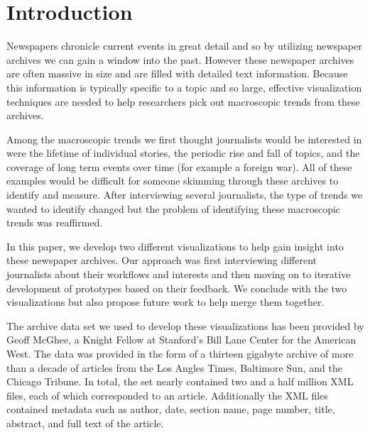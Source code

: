 \section{Introduction}
Newspapers chronicle current events in great detail and so by utilizing newspaper archives we can gain a window into the past. However these newspaper archives are often massive in size and are filled with detailed text information. Because this information is typically specific to a topic and so large, effective visualization techniques are needed to help researchers pick out macroscopic trends from these archives.

Among the macroscopic trends we first thought journalists would be interested in were the lifetime of individual stories, the periodic rise and fall of topics, and the coverage of long term events over time (for example a foreign war). All of these examples would be difficult for someone skimming through these archives to identify and measure. After interviewing several journalists, the type of trends we wanted to identify changed but the problem of identifying these macroscopic trends was reaffirmed.

In this paper, we develop two different visualizations to help gain insight into these newspaper archives. Our approach was first interviewing different journalists about their workflows and interests and then moving on to iterative development of prototypes based on their feedback. We conclude with the two visualizations but also propose future work to help merge them together.

The archive data set we used to develop these visualizations has been provided by Geoff McGhee, a Knight Fellow at Stanford's Bill Lane Center for the American West. The data was provided in the form of a thirteen gigabyte archive of more than a decade of articles from the Los Angles Times, Baltimore Sun, and the Chicago Tribune. In total, the set nearly contained two and a half million XML files, each of which corresponded to an article. Additionally the XML files contained metadata such as author, date, section name, page number, title, abstract, and full text of the article.


